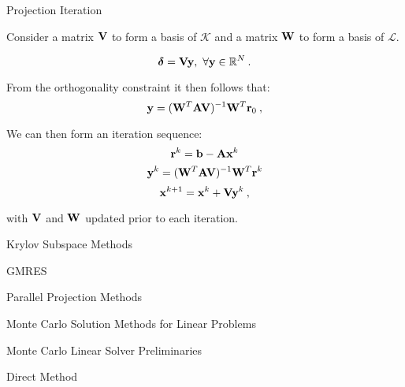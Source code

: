\documentclass{beamer}
\begin{document}
\begin{frame}{Projection Iteration}

  Consider a matrix $\mathbf{V}$ to form a basis of $\mathcal{K}$ and a
  matrix $\mathbf{W}$ to form a basis of $\mathcal{L}$.

  \[
  \boldsymbol{\delta} = \ve{V}\ve{y},\ \forall \ve{y} \in
  \mathbb{R}^N\:.
  \]

  From the orthogonality constraint it then follows that:
  \[
  \mathbf{y} = (\mathbf{W}^T\mathbf{A}\mathbf{V})^{-1}\mathbf{W}^T\mathbf{r}_0\:,
  \]

  We can then form an iteration sequence:
  \[
  \mathbf{r}^k = \mathbf{b} - \mathbf{A}\mathbf{x}^k
  \]
  \[
  \mathbf{y}^k = (\mathbf{W}^T\mathbf{A}\mathbf{V})^{-1}\mathbf{W}^T\mathbf{r}^k
  \]
  \[
  \mathbf{x}^{k+1} = \mathbf{x}^k + \mathbf{V}\mathbf{y}^k\:,
  \]

  with $\mathbf{V}$ and $\mathbf{W}$ updated prior to each iteration.

\end{frame}

\begin{frame}{Krylov Subspace Methods}

\end{frame}

\begin{frame}{GMRES}

\end{frame}

\begin{frame}{Parallel Projection Methods}

\end{frame}

\begin{frame}{Monte Carlo Solution Methods for Linear Problems}

\end{frame}

\begin{frame}{Monte Carlo Linear Solver Preliminaries}

\end{frame}

\begin{frame}{Direct Method}

\end{frame}
\end{document}
